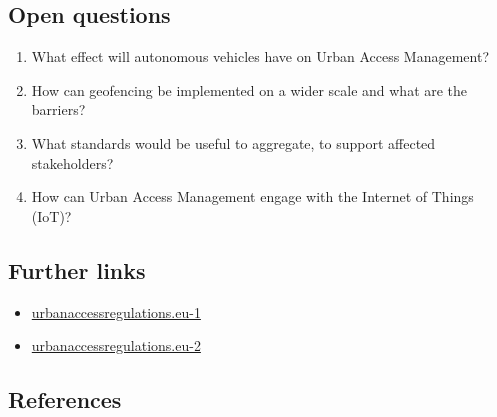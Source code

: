 \documentclass[
]{book}
\providecommand{\tightlist}{%
  \setlength{\itemsep}{0pt}\setlength{\parskip}{0pt}}
\begin{document}
\hypertarget{open-questions-7}{%
\subsection*{Open questions}\label{open-questions-7}}

\begin{enumerate}
\def\labelenumi{\arabic{enumi}.}
\tightlist
\item
  What effect will autonomous vehicles have on Urban Access Management?
\item
  How can geofencing be implemented on a wider scale and what are the barriers?
\item
  What standards would be useful to aggregate, to support affected stakeholders?
\item
  How can Urban Access Management engage with the Internet of Things (IoT)?
\end{enumerate}

\hypertarget{further-links-5}{%
\subsection*{Further links}\label{further-links-5}}

\begin{itemize}
\tightlist
\item
  \href{https://urbanaccessregulations.eu/urban-access-regulations/what-are-urban-access-regulations}{urbanaccessregulations.eu-1}
\item
  \href{https://urbanaccessregulations.eu/countries-mainmenu-147/austria-mainmenu-78/wien-vienna-emergency-scheme}{urbanaccessregulations.eu-2}
\end{itemize}

\hypertarget{references-7}{%
\subsection*{References}\label{references-7}}
\end{document}
